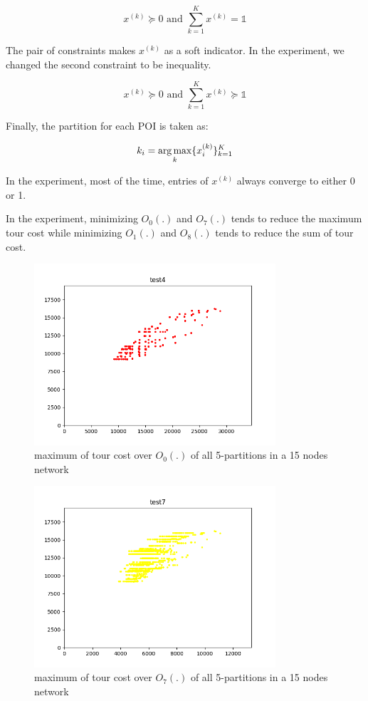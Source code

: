 \[
x^{(k)} \succeq 0 \text{ and } \sum_{k=1}^{K} x^{(k)} = \mathds{1}
\]

The pair of constraints  makes $x^{(k)}$ as a soft indicator. In the experiment, we changed the second constraint to be inequality.

\[
x^{(k)} \succeq 0 \text{ and } \sum_{k=1}^{K} x^{(k)} \succeq \mathds{1}
\]

Finally, the partition for each POI is taken as:

\[
k_i = \operatorname*{arg\,max}_k \{x^{(k)}_i\}_{k=1}^{K} 
\]

In the experiment, most of the time, entries of $x^{(k)}$ always converge to either 0 or 1.

In the experiment, minimizing $O_0(.)$ and $O_7(.)$ tends to reduce the maximum tour cost while minimizing $O_1(.)$ and $O_8(.)$ tends to reduce the sum of tour cost.

\begin{figure}[h!]
\centering
\includegraphics[width=0.8\textwidth]{assets/test0max.png}
\caption{maximum of tour cost over $O_0(.)$ of all 5-partitions in a 15 nodes network}
\label{fig:test0max}
\end{figure}

\begin{figure}[h!]
\centering
\includegraphics[width=0.8\textwidth]{assets/test7max.png}
\caption{maximum of tour cost over $O_7(.)$ of all 5-partitions in a 15 nodes network}
\label{fig:test7max}
\end{figure}

